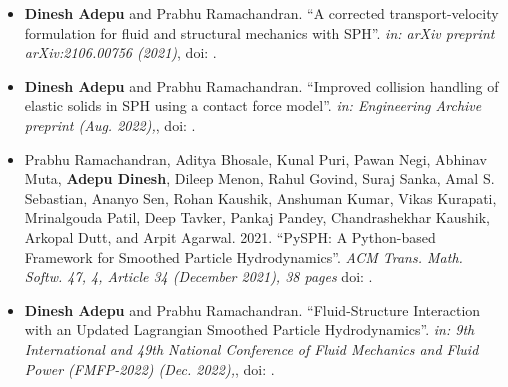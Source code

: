 %
%



\begin{itemize}
\item \textbf{Dinesh Adepu} and Prabhu Ramachandran. ``A corrected transport-velocity
formulation for fluid and structural mechanics with SPH''. \emph{in: arXiv preprint
arXiv:2106.00756 (2021)}, doi: .

\item \textbf{Dinesh Adepu} and Prabhu Ramachandran. ``Improved collision
  handling of elastic solids in SPH using a contact force model''. \emph{in:
    Engineering Archive preprint (Aug. 2022),}, doi: .

\item Prabhu Ramachandran, Aditya Bhosale, Kunal Puri, Pawan Negi, Abhinav Muta,
  \textbf{Adepu Dinesh}, Dileep Menon, Rahul Govind, Suraj Sanka, Amal S.
  Sebastian, Ananyo Sen, Rohan Kaushik, Anshuman Kumar, Vikas Kurapati,
  Mrinalgouda Patil, Deep Tavker, Pankaj Pandey, Chandrashekhar Kaushik, Arkopal
  Dutt, and Arpit Agarwal. 2021. ``PySPH: A Python-based Framework for Smoothed
  Particle Hydrodynamics''. \emph{ACM Trans. Math. Softw. 47, 4, Article 34 (December
  2021), 38 pages} doi: .
\end{itemize}



\begin{itemize}
\item \textbf{Dinesh Adepu} and Prabhu Ramachandran. ``Fluid-Structure
  Interaction with an Updated Lagrangian Smoothed Particle Hydrodynamics''.
  \emph{in: 9th International and 49th National Conference of Fluid Mechanics and Fluid Power (FMFP-2022) (Dec. 2022),}, doi: .
\end{itemize}
